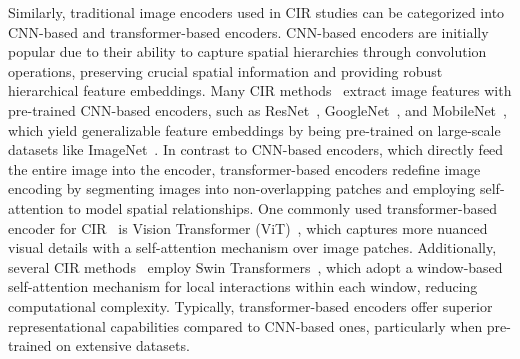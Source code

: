 Similarly, traditional image encoders used in CIR studies can be categorized into CNN-based and transformer-based encoders. CNN-based encoders are initially popular due to their ability to capture spatial hierarchies through convolution operations, preserving crucial spatial information and providing robust hierarchical feature embeddings. Many CIR methods~\cite{vo2019tirg, chen2020val,liu2021mgf,wen2021clvcnet,zhang2023pcasm,delmas2022artemis,zhang2023MLCLSAP,huang2023lgli,xu2024alret,tautkute2021Synth,zhang2024cssnet} extract image features with pre-trained CNN-based encoders, such as ResNet~\cite{krizhevsky2017imagenet}, GoogleNet~\cite{szegedy2015going}, and MobileNet~\cite{howard2017mobilenets}, which yield generalizable feature embeddings by being pre-trained on large-scale datasets like ImageNet~\cite{deng2009imagenet}. 
In contrast to CNN-based encoders, which directly feed the entire image into the encoder, transformer-based encoders redefine image encoding by segmenting images into non-overlapping patches and employing self-attention to model spatial relationships. One commonly used transformer-based encoder for CIR~\cite{song2024syncmask,udhayanan2023lmga} is Vision Transformer (ViT)~\cite{dosovitskiy2021image}, which captures more nuanced visual details with a self-attention mechanism over image patches. Additionally, several CIR methods~\cite{xu2023ComqueryFormer, hu2023provla,tian2023aacl,yang2023crn} employ Swin Transformers~\cite{liu2021swin}, which adopt a window-based self-attention mechanism for local interactions within each window, reducing computational complexity. 
Typically, transformer-based encoders offer superior representational capabilities compared to CNN-based ones, particularly when pre-trained on extensive datasets. 



